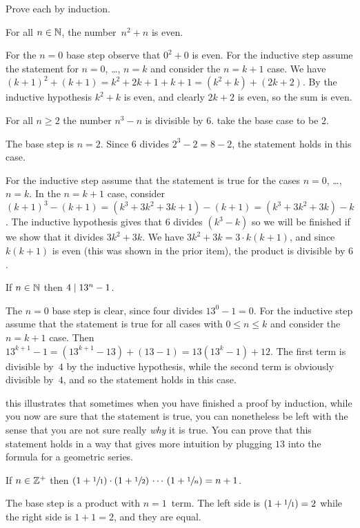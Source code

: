 \documentclass{ibl}  %
\begin{document}
\begin{problem}
Prove each by induction.
\begin{exes}
\begin{exercise}
  For all $n\in\mathbb{N}$, the number~$n^2+n$ is even.
\end{exercise}
\begin{answer}
  For the $n=0$ base step observe that $0^2+0$ is even.
  For the inductive step assume the statement for $n=0$, \ldots, $n=k$
  and consider the $n=k+1$ case.
  We have $(k+1)^2+(k+1)=k^2+2k+1+k+1=(k^2+k)+(2k+2)$. 
  By the inductive hypothesis $k^2+k$ is even, and clearly $2k+2$ is even, 
  so the sum is even.
\end{answer}
\begin{exercise} 
  For all $n\geq 2$ the number $n^3-n$ is divisible by $6$.
  \hint take the base case to be $2$.
\end{exercise}
\begin{answer}
  The base step is $n=2$.
  Since $6$ divides $2^3-2=8-2$, the statement holds in this case.

  For the inductive step assume that the statement is true for 
  the cases $n=0$, \ldots, $n=k$.
  In the $n=k+1$ case, consider 
  $(k+1)^3-(k+1)=(k^3+3k^2+3k+1)-(k+1)=(k^3+3k^2+3k)-k$.
  The inductive hypothesis gives that $6$ divides $(k^3-k)$ so we will
  be finished if we show that it divides  $3k^2+3k$.
  We have $3k^2+3k=3\cdot k(k+1)$, and since
  $k(k+1)$ is even (this was shown in the prior item),
  the product is divisible by $6$.  
\end{answer}
\begin{exercise} 
  If $n\in\mathbb{N}$ then $4\mid 13^n-1$.
\end{exercise}
\begin{answer}
  The $n=0$ base step is clear, since four divides $13^0-1=0$.
  For the inductive step assume that the statement is true for all cases 
  with $0\leq n\leq k$ and consider the $n=k+1$ case.
  Then $13^{k+1}-1=(13^{k+1}-13)+(13-1)=13(13^k-1)+12$.
  The first term is divisible by~$4$ by the inductive hypothesis, while the
  second term is obviously divisible by~$4$, and so the statement holds in 
  this case.

  \remark
  this illustrates that 
  sometimes when you have finished a proof by induction, 
  while you now are sure that the statement is true, 
  you can nonetheless be left with the sense
  that you are not sure really \emph{why} it is true.
  You can prove that this statement holds in a 
  way that gives more intuition by plugging $13$ into the formula for a
  geometric series. 
\end{answer}
\begin{exercise} 
    If $n\in\mathbb{Z}^+$ then
    $(1+\sfrac{1}{1})\cdot(1+\sfrac{1}{2})\,\cdots\,(1+\sfrac{1}{n})=n+1$.
\end{exercise}
\begin{answer}
  The base step is a product with $n=1$~term.
  The left side is $(1+\sfrac{1}{1})=2$ while the right side is $1+1=2$,
  and they are equal.


\end{answer}
\end{exes}
\end{problem}
\end{document}
